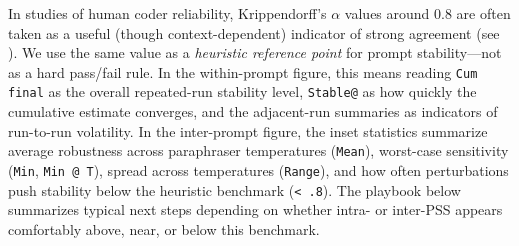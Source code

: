 \documentclass{article}
\begin{document}
In studies of human coder reliability, Krippendorff's $\alpha$ values around $0.8$ are often taken as a useful (though context-dependent) indicator of strong agreement (see \cite{krippendorff2004reliability}). We use the same value as a \emph{heuristic reference point} for prompt stability---not as a hard pass/fail rule. In the within-prompt figure, this means reading \texttt{Cum final} as the overall repeated-run stability level, \texttt{Stable@} as how quickly the cumulative estimate converges, and the adjacent-run summaries as indicators of run-to-run volatility. In the inter-prompt figure, the inset statistics summarize average robustness across paraphraser temperatures (\texttt{Mean}), worst-case sensitivity (\texttt{Min}, \texttt{Min @ T}), spread across temperatures (\texttt{Range}), and how often perturbations push stability below the heuristic benchmark (\texttt{< .8}). The playbook below summarizes typical next steps depending on whether intra- or inter-PSS appears comfortably above, near, or below this benchmark.
\end{document}
